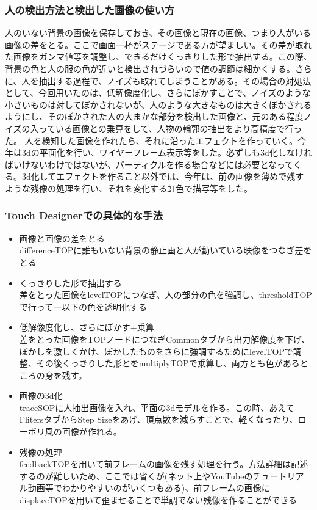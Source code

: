 \documentclass[dvipdfmx,jb5]{jarticle}
\begin{document}
\subsubsection{人の検出方法と検出した画像の使い方}
人のいない背景の画像を保存しておき、その画像と現在の画像、つまり人がいる画像の差をとる。ここで画面一杯がステージである方が望ましい。その差が取れた画像をガンマ値等を調整し、できるだけくっきりした形で抽出する。この際、背景の色と人の服の色が近いと検出されづらいので値の調節は細かくする。さらに、人を抽出する過程で、ノイズも取れてしまうことがある。その場合の対処法として、今回用いたのは、低解像度化し、さらにぼかすことで、ノイズのような小さいものは対してぼかされないが、人のような大きなものは大きくぼかされるようにし、そのぼかされた人の大まかな部分を検出した画像と、元のある程度ノイズの入っている画像との乗算をして、人物の輪郭の抽出をより高精度で行った。
人を検知した画像を作れたら、それに沿ったエフェクトを作っていく。今年は3dの平面化を行い、ワイヤーフレーム表示等をした。必ずしも3d化しなければいけないわけではないが、パーティクルを作る場合などには必要となってくる。3d化してエフェクトを作ること以外では、今年は、前の画像を薄めで残すような残像の処理を行い、それを変化する虹色で描写等をした。


\subsubsection{Touch Designerでの具体的な手法}
\begin{itemize}
\item 画像と画像の差をとる\\
differenceTOPに誰もいない背景の静止画と人が動いている映像をつなぎ差をとる
\item くっきりした形で抽出する\\
差をとった画像をlevelTOPにつなぎ、人の部分の色を強調し、thresholdTOPで行って一以下の色を透明化する
\item 低解像度化し、さらにぼかす+乗算\\
差をとった画像をTOPノードにつなぎCommonタブから出力解像度を下げ、ぼかしを激しくかけ、ぼかしたものをさらに強調するためにlevelTOPで調整、その後くっきりした形とをmultiplyTOPで乗算し、両方とも色があるところの身を残す。
\item 画像の3d化\\
traceSOPに人抽出画像を入れ、平面の3dモデルを作る。この時、あえてFlitersタブからStep Sizeをあげ、頂点数を減らすことで、軽くなったり、ローポリ風の画像が作れる。
\item 残像の処理\\
feedbackTOPを用いて前フレームの画像を残す処理を行う。方法詳細は記述するのが難しいため、ここでは省くが(ネット上やYouTubeのチュートリアル動画等でわかりやすいのがいくつもある)、前フレームの画像にdisplaceTOPを用いて歪ませることで単調でない残像を作ることができる
\end{itemize}
\end{document}
